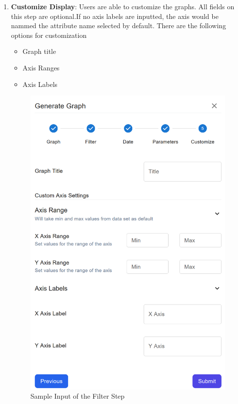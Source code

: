 \documentclass[12pt]{article}
\begin{document}
\begin{enumerate}
    \item \textbf{Customize Display}: \newline
    Users are able to customize the graphs. All fields on this step are
    optional.If no axis labels are inputted, the axis would be nammed the
    attribute name selected by default.
    \newline
    There are the following options for customization
    \begin{itemize}
        \item Graph title
        \item Axis Ranges
        \item Axis Labels
    \end{itemize}
    \begin{figure}[H]
        \centering
        \includegraphics[scale=0.6]{Images/graph-custom.png}
        \caption{Sample Input of the Filter Step}
        \label{fig:example}
    \end{figure}
\end{enumerate}
\end{document}
